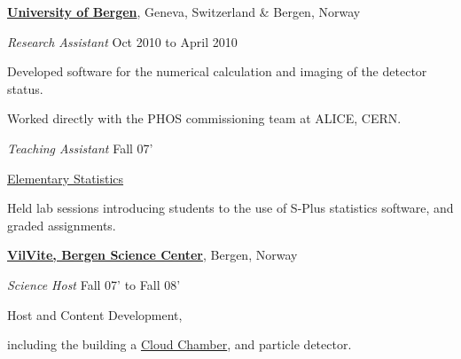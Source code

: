 \documentclass[11pt]{article}
\newenvironment{outerlist}[1][\enskip\textbullet]%
        {\begin{itemize}[#1]}{\end{itemize}%
         \vspace{-.6\baselineskip}}
\newenvironment{innerlist}[1][\enskip\textbullet]%
        {\begin{compactitem}[#1]}{\end{compactitem}}
\newcommand{\blankline}{\quad\pagebreak[2]}
\begin{document}
\href{http://www.uib.no/en}{\textbf{University of Bergen}}, 
Geneva, Switzerland \& Bergen, Norway
\begin{outerlist}
\item[] \textit{Research Assistant}
  \hfill Oct 2010 to April 2010
  \begin{innerlist}
    \footnotesize
  \item Developed software for the numerical calculation and imaging of 
    the detector status.
  \item Worked directly with the PHOS commissioning team at ALICE, CERN.
  \end{innerlist}
\item[] \textit{Teaching Assistant}
  \hfill Fall 07'
  \begin{innerlist}
    \footnotesize
  \item \href{http://www.uib.no/course/STAT101#course}{Elementary Statistics}
  \item Held lab sessions introducing students to the use of S-Plus statistics 
    software, and graded assignments.
  \end{innerlist}
\end{outerlist}

\blankline

\href{http://www.vilvite.no/english}{\textbf{VilVite, Bergen Science Center}}, 
Bergen, Norway
\begin{outerlist}
\item[] \textit{Science Host}
  \hfill Fall 07' to Fall 08'
  \begin{innerlist}
    \footnotesize
  \item Host and Content Development,
  \item including the building a \href{http://en.wikipedia.org/wiki/Cloud_chamber}{Cloud Chamber}, and particle detector.
  \end{innerlist}
\end{outerlist}

\blankline

\end{document}
